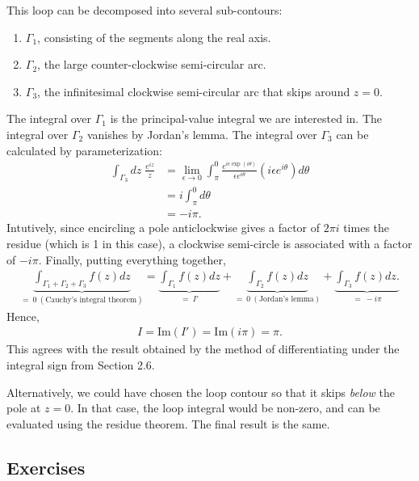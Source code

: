 \documentclass[10pt,a4paper]{article}
\begin{document}
\noindent
This loop can be decomposed into several sub-contours:
\begin{enumerate}
\item  $\Gamma_1$, consisting of the segments along the real axis.
\item $\Gamma_2$, the large counter-clockwise semi-circular arc.
\item $\Gamma_3$, the infinitesimal clockwise semi-circular arc that skips around $z = 0$.
\end{enumerate}

\noindent
The integral over $\Gamma_1$ is the principal-value integral we are
interested in.  The integral over $\Gamma_2$ vanishes by Jordan's
lemma. The integral over $\Gamma_3$ can be calculated by
parameterization:
\begin{align}
  \int_{\Gamma_3} dz\; \frac{e^{iz}}{z} &= \lim_{\epsilon \rightarrow 0} \int_{\pi}^{0} \frac{e^{i\epsilon \exp(i\theta)}}{\epsilon e^{i\theta}} \left(i\epsilon e^{i\theta}\right) d\theta \\
  &= i \int_{\pi}^0 d\theta \\
  &= - i\pi.
\end{align}
Intutively, since encircling a pole anticlockwise gives a factor of
$2\pi i$ times the residue (which is 1 in this case), a clockwise
semi-circle is associated with a factor of $- i \pi$. Finally, putting
everything together,
\begin{align}
  \underbrace{\int_{\Gamma_1 + \Gamma_2 + \Gamma_3} f(z) dz}_{ =~0~(\text{Cauchy's integral theorem})} = \underbrace{\int_{\Gamma_1} f(z) dz}_{=~I'} + \underbrace{\int_{\Gamma_2} f(z) dz}_{=~0~(\text{Jordan's lemma})} + \underbrace{\int_{\Gamma_3} f(z) dz.}_{=~-i \pi}
\end{align}
Hence,
\begin{align}
  I = \mathrm{Im}(I') = \mathrm{Im}(i\pi) = \pi.
\end{align}
This agrees with the result obtained by the method of differentiating
under the integral sign from Section 2.6.

Alternatively, we could have chosen the loop contour so that it skips
\textit{below} the pole at $z = 0$.  In that case, the loop integral
would be non-zero, and can be evaluated using the residue theorem.
The final result is the same.

\subsection{Exercises}
\label{exercises}
\end{document}
